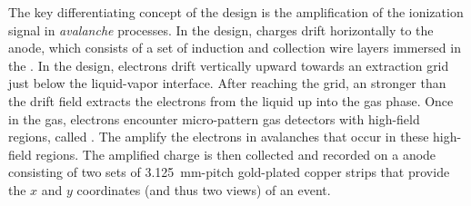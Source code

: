 The key differentiating concept of the \dual design is the amplification of the ionization signal in \textit{avalanche} processes. In the \single design, charges drift horizontally to the anode, which consists of a set of induction and collection wire layers immersed in the \lar. In the \dual design, electrons drift vertically upward towards an extraction grid just below the liquid-vapor interface. After reaching the grid, an \efield stronger than the drift field extracts the electrons from the liquid up into the gas phase. Once in the gas, electrons encounter micro-pattern gas detectors with high-field regions, called . The  amplify the electrons in avalanches that occur in these high-field regions. %
The amplified charge is then collected and recorded on a \twod anode
consisting of two sets of \SI{3.125}{mm}-pitch gold-plated copper strips that provide the $x$
and $y$ coordinates (and thus two views) of an event.


